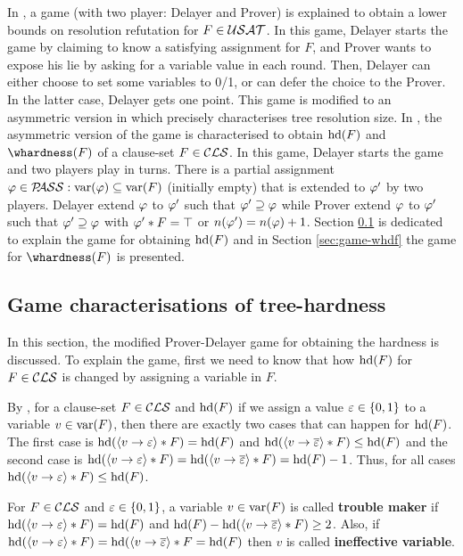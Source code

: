 \documentclass{report}
\begin{document}
In \cite{PI2000}, a game (with two player: Delayer and Prover) is explained to obtain a lower bounds on resolution refutation for $F \in \mathcal{USAT}$. In this game, Delayer starts the game by claiming to know a satisfying assignment for $F$, and Prover wants to expose his lie by asking for a variable value in each round. Then, Delayer can either choose to set some variables to 0/1, or can defer the choice to the Prover. In the latter case, Delayer gets one point. This game is modified to an asymmetric version in \cite{BGL13a} which precisely characterises tree resolution size. In \cite{BeyersdorffKullmann2014PHP,BeyersdorffGwynneKullmann2013PHPER}, the asymmetric version of the game is characterised to obtain $\operatorname{hd}(F)$ and $\whardness(F)$ of a clause-set $F \in \mathcal{CLS}$. In this game, Delayer starts the game and two players play in turns. There is a partial assignment $\varphi \in \mathcal{P\hspace{-0.32em}ASS}: \operatorname{var}(\varphi) \subseteq \operatorname{var}(F)$ (initially empty) that is extended to $\varphi'$ by two players. Delayer extend $\varphi$ to $\varphi'$ such that $\varphi' \supseteq \varphi$ while Prover extend $\varphi$ to $\varphi'$ such that $\varphi' \supseteq \varphi$ with $\varphi' * F= \top$ or $n(\varphi')=n(\varphi)+1$. Section \ref{sec:game-hdf} is dedicated to explain the game for obtaining $\operatorname{hd}(F)$ and in Section \ref{sec:game-whdf} the game for $\whardness(F)$ is presented.

\subsection{Game characterisations of tree-hardness}
\label{sec:game-hdf}

In this section, the modified Prover-Delayer game for obtaining the hardness is discussed. To explain the game, first we need to know that how $\operatorname{hd}(F)$ for $F \in \mathcal{CLS}$ is changed by assigning a variable in $F$. 

\begin{lem}\label{lem:hd-var}
By \cite{BeyersdorffKullmann2014PHP}, for a clause-set $F \in \mathcal{CLS}$ and $\operatorname{hd}(F)$ if we assign a value $\varepsilon \in \{ 0,1 \}$ to a variable $v \in \operatorname{var}(F)$, then there are exactly two cases that can happen for $\operatorname{hd}(F)$. The first case is $\operatorname{hd}(\langle v \rightarrow \varepsilon \rangle*F)=\operatorname{hd}(F)$ and $\operatorname{hd}(\langle v \rightarrow \overline {\varepsilon} \rangle*F) \leq \operatorname{hd}(F)$ and the second case is  $\operatorname{hd}(\langle v \rightarrow \varepsilon \rangle*F)=\operatorname{hd}(\langle v \rightarrow \overline {\varepsilon} \rangle*F)=\operatorname{hd}(F)-1$. Thus, for all cases  $\operatorname{hd}(\langle v \rightarrow \varepsilon \rangle*F) \leq \operatorname{hd}(F)$.
\end{lem}

\begin{defi}\label{def:var-trb}
For $F \in \mathcal{CLS}$ and  $\varepsilon \in \{ 0,1 \}$, a variable $v \in \operatorname{var}(F)$ is called \textbf{trouble maker} if $\operatorname{hd}(\langle v \rightarrow \varepsilon \rangle*F)=\operatorname{hd}(F)$ and $\operatorname{hd}(F)- \operatorname{hd}(\langle v \rightarrow \overline {\varepsilon} \rangle*F) \geq 2$. Also, if $\operatorname{hd}(\langle v \rightarrow \varepsilon \rangle*F)=\operatorname{hd}(\langle v \rightarrow \overline {\varepsilon} \rangle*F = \operatorname{hd}(F)$ then $v$ is called \textbf{ineffective variable}.
\end{defi}
\end{document}
